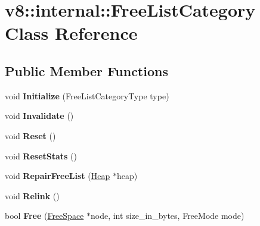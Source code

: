 \hypertarget{classv8_1_1internal_1_1_free_list_category}{}\section{v8\+:\+:internal\+:\+:Free\+List\+Category Class Reference}
\label{classv8_1_1internal_1_1_free_list_category}
\subsection*{Public Member Functions}
\begin{DoxyCompactItemize}
\item 
void {\bfseries Initialize} (Free\+List\+Category\+Type type)\hypertarget{classv8_1_1internal_1_1_free_list_category_a5f433934357036f7199d55a8410987da}{}\label{classv8_1_1internal_1_1_free_list_category_a5f433934357036f7199d55a8410987da}

\item 
void {\bfseries Invalidate} ()\hypertarget{classv8_1_1internal_1_1_free_list_category_ab1e0b8848b0bd358c227c447196b2362}{}\label{classv8_1_1internal_1_1_free_list_category_ab1e0b8848b0bd358c227c447196b2362}

\item 
void {\bfseries Reset} ()\hypertarget{classv8_1_1internal_1_1_free_list_category_ad990a3fde12ff8ad7de041d86290e30a}{}\label{classv8_1_1internal_1_1_free_list_category_ad990a3fde12ff8ad7de041d86290e30a}

\item 
void {\bfseries Reset\+Stats} ()\hypertarget{classv8_1_1internal_1_1_free_list_category_a2950a535ed7dc57b181531a387f88737}{}\label{classv8_1_1internal_1_1_free_list_category_a2950a535ed7dc57b181531a387f88737}

\item 
void {\bfseries Repair\+Free\+List} (\hyperlink{classv8_1_1internal_1_1_heap}{Heap} $\ast$heap)\hypertarget{classv8_1_1internal_1_1_free_list_category_a5c4612d807dcf03546d802ad081beb2a}{}\label{classv8_1_1internal_1_1_free_list_category_a5c4612d807dcf03546d802ad081beb2a}

\item 
void {\bfseries Relink} ()\hypertarget{classv8_1_1internal_1_1_free_list_category_a1fcddd498785db7739ad713d351b88e3}{}\label{classv8_1_1internal_1_1_free_list_category_a1fcddd498785db7739ad713d351b88e3}

\item 
bool {\bfseries Free} (\hyperlink{classv8_1_1internal_1_1_free_space}{Free\+Space} $\ast$node, int size\+\_\+in\+\_\+bytes, Free\+Mode mode)\hypertarget{classv8_1_1internal_1_1_free_list_category_a5e73f14c1e25bcd49d8e8a0102de7cc8}{}\label{classv8_1_1internal_1_1_free_list_category_a5e73f14c1e25bcd49d8e8a0102de7cc8}


\end{DoxyCompactItemize}
